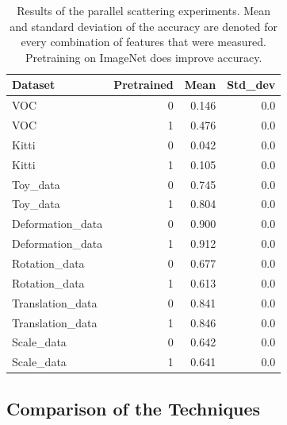 \begin{table}[!htb]
	\centering
	\caption{Results of the parallel scattering experiments. Mean and standard deviation of the accuracy are denoted for every combination of features that were measured. Pretraining on ImageNet does improve accuracy.}
	\begin{tabular}{lrrr}
		\toprule
		Dataset &  Pretrained &   Mean &  Std\_dev \\
		\midrule
		VOC &           0 &  0.146 &      0.0 \\
		VOC &           1 &  0.476 &      0.0 \\\hdashline
		Kitti &           0 &  0.042 &      0.0 \\
		Kitti &           1 &  0.105 &      0.0 \\\hdashline
		Toy\_data &           0 &  0.745 &      0.0 \\
		Toy\_data &           1 &  0.804 &      0.0 \\\hdashline
		Deformation\_data &           0 &  0.900 &      0.0 \\
		Deformation\_data &           1 &  0.912 &      0.0 \\\hdashline
		Rotation\_data &           0 &  0.677 &      0.0 \\
		Rotation\_data &           1 &  0.613 &      0.0 \\\hdashline
		Translation\_data &           0 &  0.841 &      0.0 \\
		Translation\_data &           1 &  0.846 &      0.0 \\\hdashline
		Scale\_data &           0 &  0.642 &      0.0 \\
		Scale\_data &           1 &  0.641 &      0.0 \\
		\bottomrule
	\end{tabular}
\label{table:parallel_scattering_experiments}
\end{table}

\subsection{Comparison of the Techniques}
\label{subsec:comparison_results}

